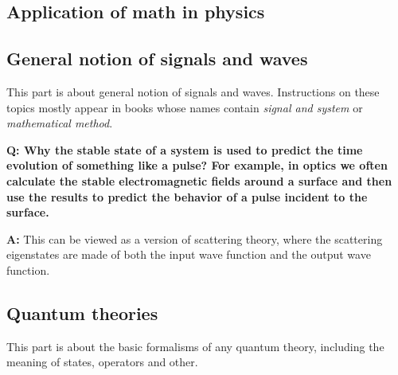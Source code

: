\documentclass[hyperref, a4paper]{article}
\newenvironment{qanda}{\setlength{\parindent}{0pt}}{\bigskip}
\newcommand{\Q}{\bigskip\bfseries Q: }
\newcommand{\A}{\par\textbf{A:} \normalfont}
\begin{document}
\subsection{Application of math in physics}

\subsection{General notion of signals and waves}

This part is about general notion of signals and waves. Instructions on these topics mostly appear in books whose names contain \emph{signal and system} or \emph{mathematical method}.

\begin{qanda}

\Q Why the stable state of a system is used to predict the time evolution of something like a pulse? 
For example, in optics we often calculate the stable electromagnetic fields around a surface and then use the results to predict
the behavior of a pulse incident to the surface.
\A This can be viewed as a version of scattering theory, where the scattering eigenstates are made of both the
input wave function and the output wave function.

\end{qanda}

\subsection{Quantum theories}

This part is about the basic formalisms of any quantum theory, including the meaning of states, operators and other.
\end{document}
